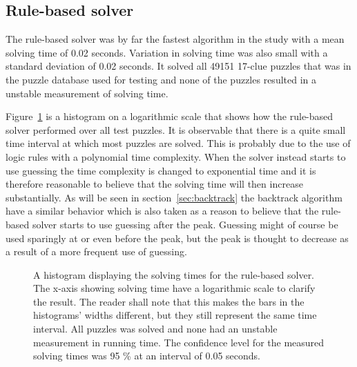 \documentclass[a4paper,11pt]{kth-mag}
\begin{document}
\FloatBarrier
\subsection{Rule-based solver}
The rule-based solver was by far the fastest algorithm in the study with a mean solving time of 0.02 seconds.
Variation in solving time was also small with a standard deviation of 0.02 seconds. 
It solved all 49151 17-clue puzzles that was in the puzzle database used for testing and none of the puzzles resulted in a unstable measurement of solving time.

Figure~\ref{fig:rulebasedHistogram} is a histogram on a logarithmic scale that shows how the rule-based solver performed over all test puzzles.
It is observable that there is a quite small time interval at which most puzzles are solved.
This is probably due to the use of logic rules with a polynomial time complexity.
When the solver instead starts to use guessing the time complexity is changed to exponential time and it is therefore reasonable to believe that the solving time will then increase substantially.
As will be seen in section~\ref{sec:backtrack} the backtrack algorithm have a similar behavior which is also taken as a reason to believe that the rule-based solver starts to use guessing after the peak.
Guessing might of course be used sparingly at or even before the peak, but the peak is thought to decrease as a result of a more frequent use of guessing.

\begin{figure}[here] 
\noindent{}
\vspace{-25pt}
\caption[Histogram with solving times for rule-based solver]{A histogram displaying the solving times for the rule-based solver. The x-axis showing solving time have a logarithmic scale to clarify the result. The reader shall note that this makes the bars in the histograms' widths different, but they still represent the same time interval. All puzzles was solved and none had an unstable measurement in running time. The confidence level for the measured solving times was 95 \% at an interval of 0.05 seconds.}
\label{fig:rulebasedHistogram}
\end{figure}
\end{document}
